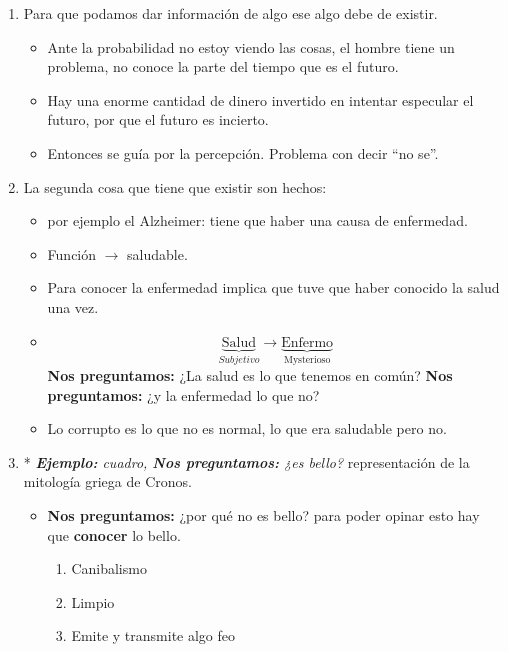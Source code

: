 \begin{enumerate}
    \item Para que podamos dar información de algo ese algo debe de existir.
        \begin{itemize}
            \item Ante la probabilidad no estoy viendo las cosas, el hombre tiene un problema, no conoce la parte del tiempo que es el futuro.
            \item Hay una enorme cantidad de dinero invertido en intentar especular el futuro, por que el futuro es incierto.
            \item Entonces se guía por la percepción. Problema con decir ``no se''.
        \end{itemize}

    \item La segunda cosa que tiene que existir son hechos: 
        \begin{itemize}
            \item por ejemplo el Alzheimer: tiene que haber una causa de enfermedad.
            \item Función $\rightarrow$ saludable.
            \item Para conocer la enfermedad implica que tuve que haber conocido la salud una vez.
            \item \[
              \underbrace{\text{Salud}}_{Subjetivo} \rightarrow \underbrace{\text{Enfermo}}_{\text{Mysterioso}}
            \]
            \textbf{Nos preguntamos:} ¿La salud es lo que tenemos en común? \textbf{Nos preguntamos:} ¿y la enfermedad lo que no?
            
            \item Lo corrupto es lo que no es normal, lo que era saludable pero no.
        \end{itemize}
    
        
    \item* \emph{\textbf{Ejemplo: }cuadro, \textbf{Nos preguntamos:} ¿es bello?} representación de la mitología griega de Cronos.
        \begin{itemize}
            \item \textbf{Nos preguntamos:} ¿por qué no es bello? para poder opinar esto hay que \textbf{conocer} lo bello.
                \begin{enumerate}
                    \item Canibalismo 
                    \item Limpio 
                    \item Emite y transmite algo feo
                \end{enumerate}
            

\end{itemize}
\end{enumerate}
